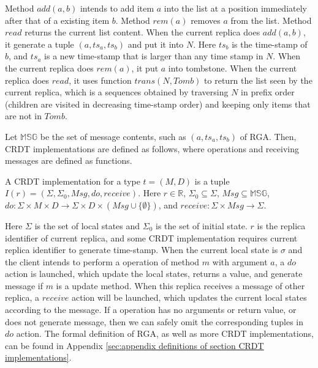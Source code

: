 Method $\mathit{add}(a,b)$ intends to add item $a$ into the list at a position immediately after that of a existing item $b$. Method $\mathit{rem}(a)$ removes $a$ from the list. Method $\mathit{read}$ returns the current list content. When the current replica does $\mathit{add}(a,b)$, it generate a tuple $(a,ts_a,ts_b)$ and put it into $N$. Here $ts_b$ is the time-stamp of $b$, and $ts_a$ is a new time-stamp that is larger than any time stamp in $N$. When the current replica does $\mathit{rem}(a)$, it put $a$ into tombstone. When the current replica does $\mathit{read}$, it uses function $\mathit{trans}(N,\mathit{Tomb})$ to return the list seen by the current replica, which is a sequences obtained by traversing $N$ in prefix order (children are visited in decreasing time-stamp order) and keeping only items that are not in $\mathit{Tomb}$.

Let $\mathbb{MSG}$ be the set of message contents, such as $(a,ts_a,ts_b)$ of RGA. Then, CRDT implementations are defined as follows, where operations and receiving messages are defined as functions.

\begin{definition}
\label{definition:operation-based CRDT implementations}
A CRDT implementation for a type $t = (M,D)$ is a tuple $I(r) = (\Sigma, \Sigma_0, \mathit{Msg}, \mathit{do},\mathit{receive})$. Here $r \in \mathbb{R}$, $\Sigma_0 \subseteq \Sigma$, $\mathit{Msg} \subseteq \mathbb{MSG}$, $\mathit{do}:\Sigma \times M \times D \rightarrow \Sigma \times D \times (\mathit{Msg} \cup \{ \emptyset \} )$, and $\mathit{receive}: \Sigma \times \mathit{Msg} \rightarrow \Sigma$.
\end{definition}

Here $\Sigma$ is the set of local states and $\Sigma_0$ is the set of initial state. $r$ is the replica identifier of current replica, and some CRDT implementation requires current replica identifier to generate time-stamp. When the current local state is $\sigma$ and the client intends to perform a operation of method $m$ with argument $a$, a $\mathit{do}$ action is launched, which update the local states, returns a value, and generate message if $m$ is a update method. When this replica receives a message of other replica, a $\mathit{receive}$ action will be launched, which updates the current local states according to the message. If a operation has no arguments or return value, or does not generate message, then we can safely omit the corresponding tuples in $\mathit{do}$ action.
The formal definition of RGA, as well as more CRDT implementations, can be found in  Appendix \ref{sec:appendix definitions of section CRDT implementations}.

















